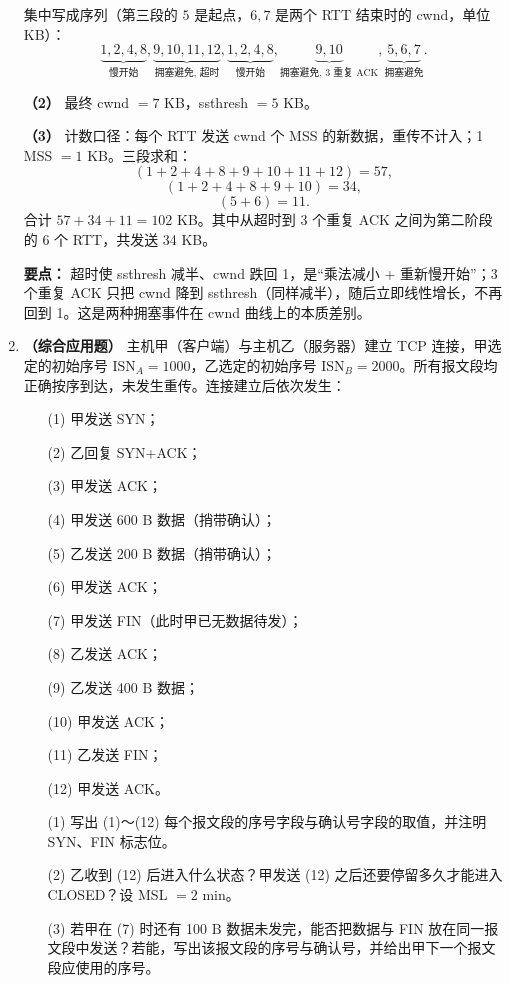 \begin{enumerate}
集中写成序列（第三段的 $5$ 是起点，$6,7$ 是两个 RTT 结束时的 cwnd，单位 KB）：
\[
\underbrace{1,2,4,8}_{\text{慢开始}},\underbrace{9,10,11,12}_{\text{拥塞避免, 超时}},
\underbrace{1,2,4,8}_{\text{慢开始}},\underbrace{9,10}_{\text{拥塞避免, 3 重复 ACK}},
\underbrace{5,6,7}_{\text{拥塞避免}}.
\]

\textbf{（2）} 最终 cwnd $=7$ KB，ssthresh $=5$ KB。

\textbf{（3）} 计数口径：每个 RTT 发送 cwnd 个 MSS 的新数据，重传不计入；1 MSS $=1$ KB。三段求和：
\[
(1+2+4+8+9+10+11+12)=57,
\]
\[
(1+2+4+8+9+10)=34,
\]
\[
(5+6)=11.
\]
合计 $57+34+11=102$ KB。其中从超时到 3 个重复 ACK 之间为第二阶段的 6 个 RTT，共发送 34 KB。

\textbf{要点：} 超时使 ssthresh 减半、cwnd 跌回 1，是“乘法减小 + 重新慢开始”；3 个重复 ACK 只把 cwnd 降到 ssthresh（同样减半），随后立即线性增长，不再回到 1。这是两种拥塞事件在 cwnd 曲线上的本质差别。

\else \answerarea[10] \fi

\item \textbf{（综合应用题）} 主机甲（客户端）与主机乙（服务器）建立 TCP 连接，甲选定的初始序号 $\text{ISN}_A=1000$，乙选定的初始序号 $\text{ISN}_B=2000$。所有报文段均正确按序到达，未发生重传。连接建立后依次发生：

\begin{enumerate}
\item[(1)] 甲发送 SYN；
\item[(2)] 乙回复 SYN+ACK；
\item[(3)] 甲发送 ACK；
\item[(4)] 甲发送 600 B 数据（捎带确认）；
\item[(5)] 乙发送 200 B 数据（捎带确认）；
\item[(6)] 甲发送 ACK；
\item[(7)] 甲发送 FIN（此时甲已无数据待发）；
\item[(8)] 乙发送 ACK；
\item[(9)] 乙发送 400 B 数据；
\item[(10)] 甲发送 ACK；
\item[(11)] 乙发送 FIN；
\item[(12)] 甲发送 ACK。
\end{enumerate}

\begin{enumerate}
\item[(1)] 写出 (1)～(12) 每个报文段的序号字段与确认号字段的取值，并注明 SYN、FIN 标志位。
\item[(2)] 乙收到 (12) 后进入什么状态？甲发送 (12) 之后还要停留多久才能进入 CLOSED？设 MSL $=2$ min。
\item[(3)] 若甲在 (7) 时还有 100 B 数据未发完，能否把数据与 FIN 放在同一报文段中发送？若能，写出该报文段的序号与确认号，并给出甲下一个报文段应使用的序号。
\end{enumerate}


\end{enumerate}
